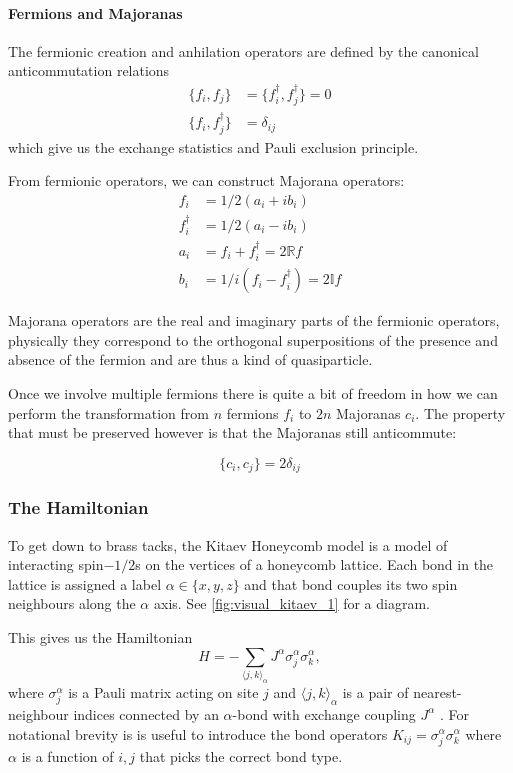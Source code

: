 \hypertarget{fermions-and-majoranas}{%
\paragraph{Fermions and Majoranas}\label{fermions-and-majoranas}}

The fermionic creation and anhilation operators are defined by the canonical anticommutation relations \[\begin{aligned}
\{f_i, f_j\} &= \{f^\dagger_i, f^\dagger_j\} = 0\\
\{f_i, f^\dagger_j\} &= \delta_{ij}
\end{aligned}\] which give us the exchange statistics and Pauli exclusion principle.

From fermionic operators, we can construct Majorana operators: \[\begin{aligned}
f_i         &= 1/2 (a_i + ib_i)\\
f^\dagger_i &= 1/2(a_i - ib_i)\\
a_i         &= f_i + f^\dagger_i = 2\mathbb{R}f\\
b_i         &= 1/i(f_i - f^\dagger_i) = 2\mathbb{I} f 
\end{aligned}\]

Majorana operators are the real and imaginary parts of the fermionic operators, physically they correspond to the orthogonal superpositions of the presence and absence of the fermion and are thus a kind of quasiparticle.

Once we involve multiple fermions there is quite a bit of freedom in how we can perform the transformation from \(n\) fermions \(f_i\) to \(2n\) Majoranas \(c_i\). The property that must be preserved however is that the Majoranas still anticommute:

\[ \{c_i, c_j\} = 2\delta_{ij}\]

\hypertarget{the-hamiltonian}{%
\subsubsection{The Hamiltonian}\label{the-hamiltonian}}

To get down to brass tacks, the Kitaev Honeycomb model is a model of interacting spin\(-1/2\)s on the vertices of a honeycomb lattice. Each bond in the lattice is assigned a label \(\alpha \in \{ x, y, z\}\) and that bond couples its two spin neighbours along the \(\alpha\) axis. See \cref{fig:visual_kitaev_1} for a diagram.

This gives us the Hamiltonian \[H =  - \sum_{\langle j,k\rangle_\alpha} J^{\alpha}\sigma_j^{\alpha}\sigma_k^{\alpha},\] where \(\sigma^\alpha_j\) is a Pauli matrix acting on site \(j\) and \(\langle j,k\rangle_\alpha\) is a pair of nearest-neighbour indices connected by an \(\alpha\)-bond with exchange coupling \(J^\alpha\) \textcite{kitaevAnyonsExactlySolved2006}. For notational brevity is is useful to introduce the bond operators \(K_{ij} = \sigma_j^{\alpha}\sigma_k^{\alpha}\) where \(\alpha\) is a function of \(i,j\) that picks the correct bond type.

